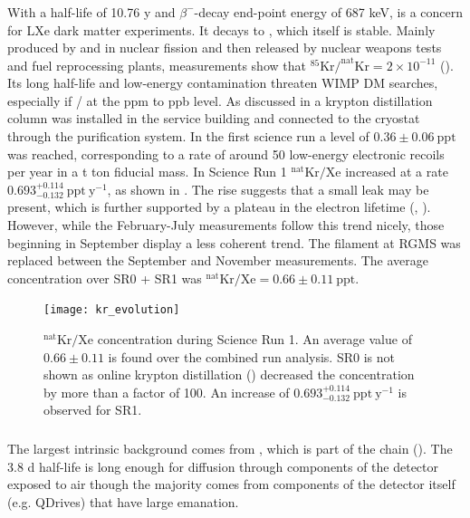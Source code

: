 \subsubsection{}
\label{subsubsec:backgrounds_electronic_krypton}
With a half-life of 10.76 y and $\beta^-$-decay end-point energy of 687 keV,  is a concern for LXe dark matter
experiments.  It decays to , which itself is stable.  Mainly
produced by  and  in nuclear fission and then released by nuclear weapons tests and fuel reprocessing plants,
measurements show that $\mathrm{^{85}Kr / ^{nat}Kr} = 2 \times 10^{-11}$ ().  Its long half-life and low-energy
contamination threaten WIMP DM searches, especially if / at the ppm to ppb level.  As discussed in
 a krypton distillation column was installed in the service building and connected to the cryostat through
the purification system.  In the first science run a level of $0.36 \pm 0.06\ \mathrm{ppt}$ was reached, corresponding to a rate of
around 50 low-energy electronic recoils per year in a t ton fiducial mass.  In Science Run 1 $\mathrm{^{nat}Kr / Xe}$ increased at a rate
$0.693_{-0.132}^{+0.114}\ \mathrm{ppt\ y^{-1}}$, as shown in
.  The rise suggests that a small leak may be present, which is further supported
by a plateau in the electron lifetime (, ).  However, while the February-July
measurements follow this trend nicely, those beginning in September display a less coherent trend.  The filament at RGMS was replaced
between the September and November measurements.  The average concentration over SR0 + SR1 was
$^{\mathrm{nat}}\mathrm{Kr}/\mathrm{Xe} = 0.66 \pm 0.11\ \mathrm{ppt}$.

\begin{figure}
\centering
\texttt{[image: kr\_evolution]}
\caption{$\mathrm{^{nat}Kr / Xe}$ concentration during Science Run 1.  An average value of $0.66 \pm 0.11$ is found over the combined
run analysis.  SR0 is not shown as online krypton distillation () decreased the concentration by more than
a factor of 100.  An increase of $0.693_{-0.132}^{+0.114}\ \mathrm{ppt\ y^{-1}}$ is observed for SR1.}
\label{fig:backgrounds_electronic_krypton_rate_increase}
\end{figure}

\subsubsection{}
\label{subsubsec:backgrounds_electronic_radon}
The largest intrinsic background comes from , which is part of the  chain
().  The 3.8 d half-life is long enough for diffusion through components of the detector exposed
to air though the majority comes from components of the detector itself (e.g. QDrives) that have large  emanation.


